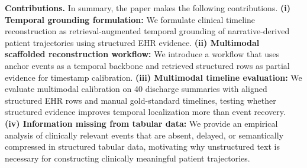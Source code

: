 \textbf{Contributions.} In summary, the paper makes the following contributions. \textbf{(i) Temporal grounding formulation:} We formulate clinical timeline reconstruction as retrieval-augmented temporal grounding of narrative-derived patient trajectories using structured EHR evidence. \textbf{(ii) Multimodal scaffolded reconstruction workflow:} We introduce a workflow that uses anchor events as a temporal backbone and retrieved structured rows as partial evidence for timestamp calibration. \textbf{ (iii) Multimodal timeline evaluation:} We evaluate multimodal calibration on 40 discharge summaries with aligned structured EHR rows and manual gold-standard timelines, testing whether structured evidence improves temporal localization more than event recovery. \textbf{(iv) Information missing from tabular data:} We provide an empirical analysis of clinically relevant events that are absent, delayed, or semantically compressed in structured tabular data, motivating why unstructured text is necessary for constructing clinically meaningful patient trajectories.


